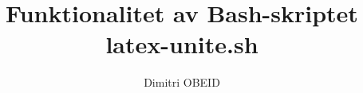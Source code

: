 \documentclass[a4paper,10pt]{article}
\title{\color{red}Funktionalitet av Bash-skriptet \\ \textbf{\color{sec2}latex-unite.sh}}\color{text}
\author{Dimitri OBEID}
\begin{document}
    \maketitle
    \newpage

    \hypertarget{contents}{}
    \tableofcontents
    \newpage

    \color{sec1}
    \section{}\color{text}




\end{document}
